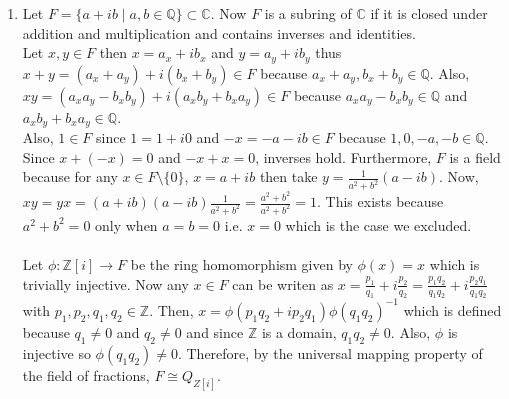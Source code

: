 \documentclass[12pt]{extarticle}
\newcommand{\Z}{\mathbb{Z}}
\newcommand{\C}{\mathbb{C}}
\newcommand{\Q}{\mathbb{Q}}
\newcommand{\sm}{\! \setminus \!}
\begin{document}
\begin{enumerate}
\item Let $F = \{a + ib \mid a, b \in \Q \} \subset \C$. Now $F$ is a subring of $\C$ if it is closed under addition and multiplication and contains inverses and identities.\\

Let $x, y \in F$ then $x = a_x + ib_x$ and $y = a_y + ib_y$ thus $x + y = (a_x + a_y) + i (b_x + b_y) \in F$ because $a_x + a_y, b_x + b_y \in \Q$. Also, $xy = (a_x a_y - b_x b_y) + i (a_x b_y + b_x a_y) \in F$ because $a_x a_y - b_x b_y \in \Q$ and  $a_x b_y + b_x a_y \in \Q$. \\

Also, $1 \in F$ since $1 = 1+i0$ and $-x = -a - ib \in F$ because $1,0, -a, -b \in \Q$. Since $x + (-x) = 0$ and $-x + x = 0$, inverses hold. Furthermore, $F$ is a field because for any $x \in F \sm \{0\}$, $x = a + ib$ then take $y = \frac{1}{a^2 + b^2} (a-ib)$. Now, $xy = yx = (a+ib)(a-ib)\frac{1}{a^2 + b^2} = \frac{a^2 + b^2}{a^2 + b^2} = 1$. This exists because $a^2 + b^2 = 0$ only when $a = b = 0$ i.e. $x = 0$ which is the case we excluded. \\ \\

Let $\phi : \Z[i] \rightarrow F$ be the ring homomorphism given by $\phi(x) = x$ which is trivially injective. Now any $x \in F$ can be writen as $x = \frac{p_1}{q_1} + i \frac{p_2}{q_2} = \frac{p_1 q_2}{q_1 q_2} + i \frac{p_2 q_1}{q_1 q_2}$ with $p_1, p_2, q_1, q_2 \in \Z$. Then, $x = \phi(p_1 q_2 + i p_2 q_1) \phi(q_1 q_2)^{-1}$ which is defined because $q_1 \neq 0$ and $q_2 \neq 0$ and since $\Z$ is a domain, $q_1 q_2 \neq 0$. Also, $\phi$ is injective so $\phi(q_1 q_2) \neq 0$. Therefore, by the universal mapping property of the field of fractions, $F \cong Q_{Z[i]}$. 

\end{enumerate}
\end{document}
